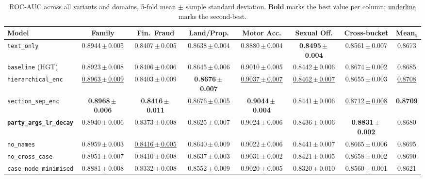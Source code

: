 \begin{table}[H]
  \centering
  \scriptsize
  \setlength{\tabcolsep}{3pt}
  \begin{adjustbox}{max width=\textwidth}
  \begin{tabular}{lccccccc}
    \toprule
    Model & Family & Fin.\ Fraud & Land/Prop. & Motor Acc. & Sexual Off. & Cross-bucket & Mean$_5$ \\
    \midrule
    \texttt{text\_only} & 0.8944\,$\pm$\,0.005 & 0.8407\,$\pm$\,0.005 & 0.8638\,$\pm$\,0.004 & 0.8880\,$\pm$\,0.004 & \textbf{0.8495\,$\pm$\,0.004} & 0.8561\,$\pm$\,0.007 & 0.8673 \\
    \texttt{baseline} (HGT) & 0.8923\,$\pm$\,0.008 & 0.8406\,$\pm$\,0.006 & 0.8645\,$\pm$\,0.006 & 0.9010\,$\pm$\,0.005 & 0.8442\,$\pm$\,0.006 & 0.8674\,$\pm$\,0.002 & 0.8685 \\
    \texttt{hierarchical\_enc} & \underline{0.8963\,$\pm$\,0.009} & 0.8403\,$\pm$\,0.009 & \textbf{0.8676\,$\pm$\,0.007} & \underline{0.9037\,$\pm$\,0.007} & \underline{0.8462\,$\pm$\,0.007} & 0.8655\,$\pm$\,0.003 & \underline{0.8708} \\
    \texttt{section\_sep\_enc} & \textbf{0.8968\,$\pm$\,0.006} & \textbf{0.8416\,$\pm$\,0.011} & \underline{0.8676\,$\pm$\,0.005} & \textbf{0.9044\,$\pm$\,0.004} & 0.8441\,$\pm$\,0.006 & \underline{0.8712\,$\pm$\,0.008} & \textbf{0.8709} \\
    \textbf{\texttt{party\_args\_lr\_decay}} & 0.8940\,$\pm$\,0.006 & 0.8373\,$\pm$\,0.008 & 0.8625\,$\pm$\,0.007 & 0.9024\,$\pm$\,0.006 & 0.8436\,$\pm$\,0.006 & \textbf{0.8831\,$\pm$\,0.002} & 0.8680 \\
    \texttt{no\_names} & 0.8959\,$\pm$\,0.003 & \underline{0.8416\,$\pm$\,0.005} & 0.8640\,$\pm$\,0.009 & 0.9022\,$\pm$\,0.006 & 0.8441\,$\pm$\,0.007 & 0.8665\,$\pm$\,0.006 & 0.8695 \\
    \texttt{no\_cross\_case} & 0.8951\,$\pm$\,0.007 & 0.8410\,$\pm$\,0.008 & 0.8637\,$\pm$\,0.003 & 0.9031\,$\pm$\,0.002 & 0.8421\,$\pm$\,0.005 & 0.8658\,$\pm$\,0.002 & 0.8690 \\
    \texttt{case\_node\_minimised} & 0.8881\,$\pm$\,0.008 & 0.8332\,$\pm$\,0.008 & 0.8552\,$\pm$\,0.009 & 0.9020\,$\pm$\,0.005 & 0.8320\,$\pm$\,0.010 & 0.8560\,$\pm$\,0.001 & 0.8621 \\
    \bottomrule
  \end{tabular}
  \end{adjustbox}
  \caption{ROC-AUC across all variants and domains, 5-fold mean
  $\pm$ sample standard deviation. \textbf{Bold} marks the best
  value per column; \underline{underline} marks the second-best.}
  \label{tab:cross_bucket_rocauc}
\end{table}


